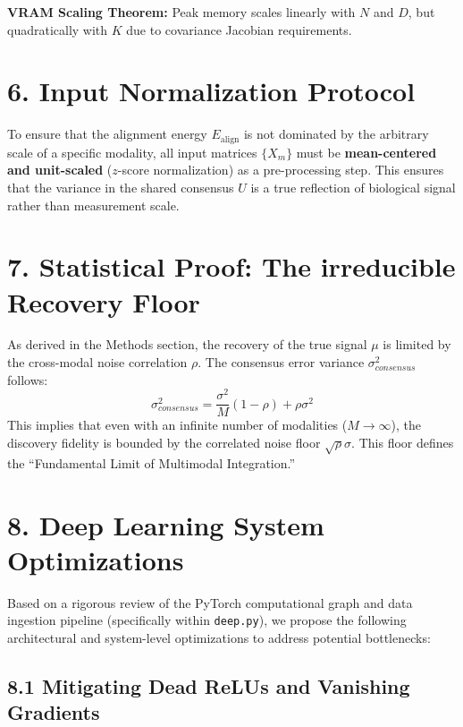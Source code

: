 \documentclass[
  letterpaper,
]{report}
\begin{document}
\textbf{VRAM Scaling Theorem:} Peak memory scales linearly with \(N\)
and \(D\), but quadratically with \(K\) due to covariance Jacobian
requirements.

\section{6. Input Normalization
Protocol}\label{input-normalization-protocol}

To ensure that the alignment energy \(E_{\text{align}}\) is not
dominated by the arbitrary scale of a specific modality, all input
matrices \(\{X_m\}\) must be \textbf{mean-centered and unit-scaled}
(\(z\)-score normalization) as a pre-processing step. This ensures that
the variance in the shared consensus \(U\) is a true reflection of
biological signal rather than measurement scale.

\section{7. Statistical Proof: The irreducible Recovery
Floor}\label{statistical-proof-the-irreducible-recovery-floor}

As derived in the Methods section, the recovery of the true signal
\(\mu\) is limited by the cross-modal noise correlation \(\rho\). The
consensus error variance \(\sigma^2_{consensus}\) follows:
\[ \sigma^2_{consensus} = \frac{\sigma^2}{M} (1 - \rho) + \rho \sigma^2 \]
This implies that even with an infinite number of modalities
(\(M \to \infty\)), the discovery fidelity is bounded by the correlated
noise floor \(\sqrt{\rho}\sigma\). This floor defines the ``Fundamental
Limit of Multimodal Integration.''

\section{8. Deep Learning System
Optimizations}\label{deep-learning-system-optimizations}

Based on a rigorous review of the PyTorch computational graph and data
ingestion pipeline (specifically within \texttt{deep.py}), we propose
the following architectural and system-level optimizations to address
potential bottlenecks:

\subsection{8.1 Mitigating Dead ReLUs and Vanishing
Gradients}\label{mitigating-dead-relus-and-vanishing-gradients}
\end{document}

